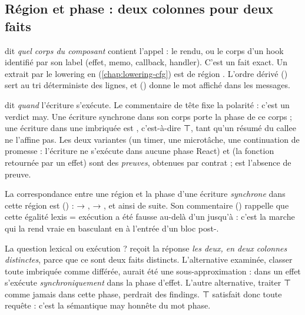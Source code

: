 \subsection{Région et phase : deux colonnes pour deux faits}


 dit \emph{quel corps du composant} contient l'appel : le rendu, ou le corps d'un hook identifié par son label (effet, memo, callback, handler). C'est un fait exact. Un  extrait par le lowering en  (\cref{chap:lowering-cfg}) est de région . L'ordre dérivé () sert au tri déterministe des lignes, et  () donne le mot affiché dans les messages.


 dit \emph{quand} l'écriture s'exécute. Le commentaire de tête fixe la polarité : c'est un verdict may. Une écriture synchrone dans son corps porte la phase de ce corps ; une écriture dans une  imbriquée est , c'est-à-dire ⊤, tant qu'un résumé du callee ne l'affine pas. Les deux variantes  (un timer, une microtâche, une continuation de promesse : l'écriture ne s'exécute dans aucune phase React) et  (la fonction retournée par un effet) sont des \emph{preuves}, obtenues par contrat ;  est l'absence de preuve.

La correspondance entre une région et la phase d'une écriture \emph{synchrone} dans cette région est  () :  → ,  → , et ainsi de suite. Son commentaire () rappelle que cette égalité \og lexis = exécution\fg{} a été fausse au-delà d'un  jusqu'à  : c'est la marche qui la rend vraie en basculant en  à l'entrée d'un bloc post-.

\begin{decision}
La question \og lexical ou exécution ?\fg{} reçoit la réponse \emph{les deux, en deux colonnes distinctes}, parce que ce sont deux faits distincts. L'alternative examinée, classer toute  imbriquée comme différée, aurait été une sous-approximation :  dans un effet s'exécute \emph{synchroniquement} dans la phase d'effet. L'autre alternative, traiter ⊤ comme \og jamais dans cette phase\fg{}, perdrait des findings. ⊤ satisfait donc toute requête  : c'est \og la sémantique may honnête du mot phase\fg{}.
\end{decision}


